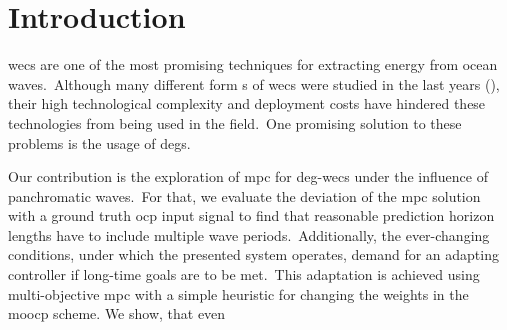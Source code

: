 \section{Introduction}
\acp{wec} are one of the most promising techniques for extracting energy from ocean waves.\ 
Although many different form s of \acp{wec} were studied in the last years (), their high technological complexity and deployment costs have hindered these technologies from being used in the field.\ 
One promising solution to these problems is the usage of \acp{deg}.

Our contribution is the exploration of \ac{mpc} for \ac{deg}-\acp{wec} under the influence of panchromatic waves.\ 
For that, we evaluate the deviation of the \ac{mpc} solution with a ground truth \ac{ocp} input signal to find that reasonable prediction horizon lengths have to include multiple wave periods.\ 
Additionally, the ever-changing conditions, under which the presented system operates, demand for an adapting controller if long-time goals are to be met.\ 
This adaptation is achieved using multi-objective \ac{mpc} with a simple heuristic for changing the weights in the \ac{moocp} scheme.
We show, that even 